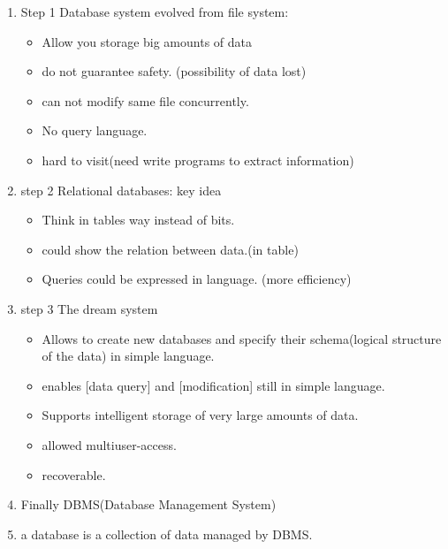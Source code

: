 \begin{enumerate}
    \item Step 1 Database system evolved from file system:
    \begin{itemize}
        \item Allow you storage big amounts of data
        \item do not guarantee safety. (possibility of data lost)
        \item can not modify same file concurrently.
        \item No query language.
        \item hard to visit(need write programs to extract information)
    \end{itemize}
    \item step 2 Relational databases: key idea
    \begin{itemize}
        \item Think in tables way instead of bits.
        \item could show the relation between data.(in table)
        \item Queries could be expressed in language. (more efficiency)
    \end{itemize}
    \item  step 3 The dream system
    \begin{itemize}
        \item Allows to create new databases and specify their schema(logical structure of the data) in simple language.
        \item enables [data query] and [modification] still in simple language.
        \item Supports intelligent storage of very large amounts of data.
        \item allowed multiuser-access.
        \item recoverable.
    \end{itemize}
    \item Finally DBMS(Database Management System)
    \item a database is a collection of data managed by DBMS.
    
\end{enumerate}